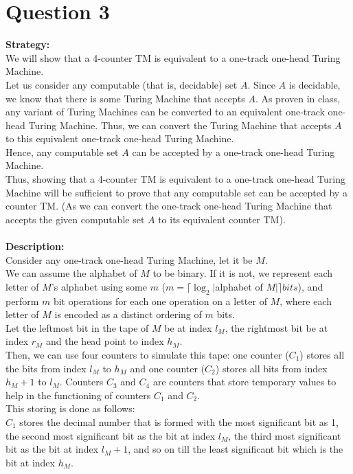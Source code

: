 \documentclass[12pt,a4paper]{article}
\begin{document}
\section{Question 3}
\textbf{Strategy:}
\\We will show that a 4-counter TM is equivalent to a one-track one-head Turing Machine. 
\\Let us consider any computable (that is, decidable) set $A$. Since $A$ is decidable, we know that there is some Turing Machine that accepts $A$. As proven in class, any variant of Turing Machines can be converted to an equivalent one-track one-head Turing Machine. Thus, we can convert the Turing Machine that accepts $A$ to this equivalent one-track one-head Turing Machine.
\\Hence, any computable set $A$ can be accepted by a one-track one-head Turing Machine.
\\Thus, showing that a 4-counter TM is equivalent to a one-track one-head Turing Machine will be sufficient to prove that any computable set can be accepted by a counter TM. (As we can convert the one-track one-head Turing Machine that accepts the given computable set $A$ to its equivalent counter TM).
\\
\\ \textbf{Description:}
\\Consider any one-track one-head Turing Machine, let it be $M$.
\\We can assume the alphabet of $M$ to be binary. If it is not, we represent each letter of $M$'s alphabet using some $m$ ($ m =  \lceil \log_2 \vert $alphabet of $M \vert \rceil bits$), and perform $m$ bit operations for each one operation on a letter of $M$, where each letter of $M$ is encoded as a distinct ordering of $m$ bits.
\\Let the leftmost bit in the tape of $M$ be at index $l_M$, the rightmost bit be at index $r_M$ and the head point to index $h_M$.
\\Then, we can use four counters to simulate this tape: one counter ($C_1$) stores all the bits from index $l_M$ to $h_M$ and one counter ($C_2$) stores all bits from index $h_M + 1$ to $l_M$. Counters $C_3$ and $C_4$ are counters that store temporary values to help in the functioning of counters $C_1$ and $C_2$.
\\This storing is done as follows:
\\$C_1$ stores the decimal number that is formed with the most significant bit as 1, the second most significant bit as the bit at index $l_M$, the third most significant bit as the bit at index $l_M + 1$, and so on till the least significant bit which is the bit at index $h_M$.
\end{document}
